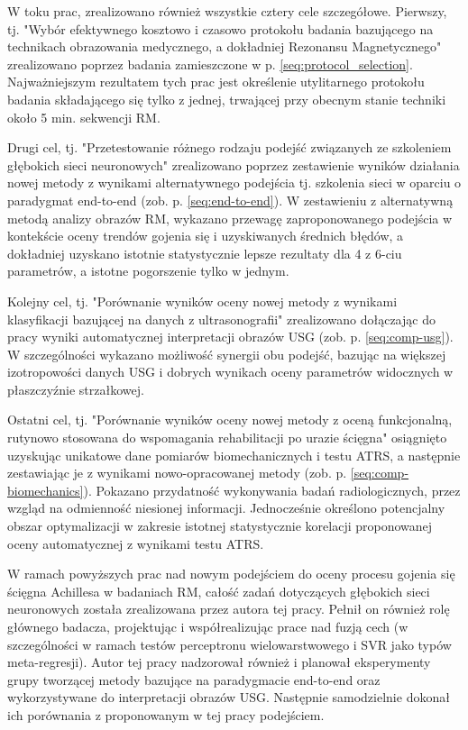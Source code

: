 W toku prac, zrealizowano również wszystkie cztery cele szczegółowe. Pierwszy, tj. "Wybór efektywnego kosztowo i czasowo protokołu badania bazującego \linebreak na technikach obrazowania medycznego, a dokładniej Rezonansu Magnetycznego" zrealizowano poprzez badania zamieszczone w p. \ref{seq:protocol_selection}. Najważniejszym rezultatem tych prac jest określenie utylitarnego protokołu badania składającego się tylko \linebreak z jednej, trwającej przy obecnym stanie techniki około 5 min. sekwencji RM. 

Drugi cel, tj. "Przetestowanie różnego rodzaju podejść związanych ze szkoleniem głębokich sieci neuronowych" zrealizowano poprzez zestawienie wyników działania nowej metody z wynikami alternatywnego podejścia tj. szkolenia sieci w oparciu \linebreak o paradygmat end-to-end (zob. p. \ref{seq:end-to-end}). W zestawieniu z alternatywną metodą analizy obrazów RM, wykazano przewagę zaproponowanego podejścia w kontekście oceny trendów gojenia się i uzyskiwanych średnich błędów, a dokładniej uzyskano istotnie statystycznie lepsze rezultaty dla 4 z 6-ciu parametrów, a istotne pogorszenie tylko w jednym. 

Kolejny cel, tj. "Porównanie wyników oceny nowej metody z wynikami klasyfikacji bazującej na danych z ultrasonografii" zrealizowano dołączając do pracy wyniki automatycznej interpretacji obrazów USG (zob. p. \ref{seq:comp-usg}). W szczególności wykazano możliwość synergii obu podejść, bazując na większej izotropowości danych USG \linebreak i dobrych wynikach oceny parametrów widocznych w płaszczyźnie strzałkowej.

Ostatni cel, tj. "Porównanie wyników oceny nowej metody z oceną funkcjonalną, rutynowo stosowana do wspomagania rehabilitacji po urazie ścięgna" osiągnięto uzyskując unikatowe dane pomiarów biomechanicznych i testu ATRS, a następnie zestawiając je z wynikami nowo-opracowanej metody (zob. p. \ref{seq:comp-biomechanics}). Pokazano przydatność wykonywania badań radiologicznych, przez wzgląd na odmienność niesionej informacji. Jednocześnie określono potencjalny obszar optymalizacji w zakresie istotnej statystycznie korelacji proponowanej oceny automatycznej z wynikami testu ATRS.  

W ramach powyższych prac nad nowym podejściem do oceny procesu gojenia się ścięgna Achillesa w badaniach RM, całość zadań dotyczących głębokich sieci neuronowych została zrealizowana przez autora tej pracy. Pełnił on również rolę głównego badacza, projektując i współrealizując prace nad fuzją cech (w szczególności w ramach testów perceptronu wielowarstwowego i SVR jako typów meta-regresji). Autor tej pracy nadzorował również i planował eksperymenty grupy tworzącej metody bazujące na paradygmacie end-to-end oraz wykorzystywane do interpretacji obrazów USG. Następnie samodzielnie dokonał ich porównania z proponowanym w tej pracy podejściem. 

